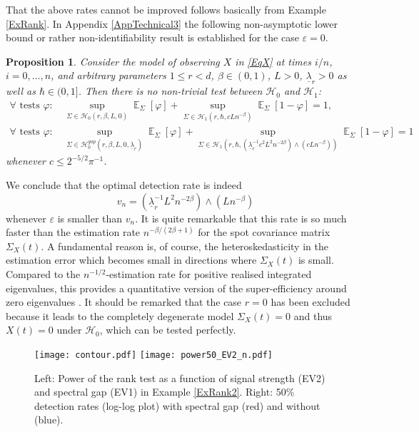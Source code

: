 \documentclass[preprint,aos]{imsart}
\numberwithin{equation}{section}
\newtheorem{proposition}[satz]{Proposition}
\theoremstyle{remark}
\DeclareMathOperator{\E}{{\mathbb E}}
\providecommand{\eps}{\varepsilon}
\renewcommand{\phi}{\varphi}
\renewcommand{\le}{\leqslant}
\begin{document}
That the above rates cannot be improved follows basically from Example \ref{ExRank}. In Appendix \ref{AppTechnical3}  the following non-asymptotic lower bound or rather non-identifiability result is established  for the case $\eps=0$.

\begin{proposition}\label{PropLB}
Consider the model of observing $X$ in \eqref{EqX} at times $i/n$, $i=0,\ldots,n$, and arbitrary parameters $1\le r<d$, $\beta\in(0,1)$, $L>0$, $\underline\lambda_r> 0$ as well as $\hbar\in(0,1]$.
Then there is no non-trivial test between ${\mathcal H}_0$ and ${\mathcal H}_1$:
\begin{align*} \forall\text{ tests }\phi:&\, \sup_{\Sigma\in {\mathcal H}_0(r,\beta,L,0)}\E_\Sigma[\phi]+ \sup_{\Sigma\in {\mathcal H}_1(r,\hbar,cLn^{-\beta})}\E_\Sigma[1-\phi]=1,\\
\forall\text{ tests }\phi:&\, \sup_{\Sigma\in {\mathcal H}_0^{gap}(r,\beta,L,0,\underline\lambda_{r})}\E_\Sigma[\phi]+ \sup_{\Sigma\in {\mathcal H}_1(r,\hbar,(\underline\lambda_r^{-1}c^2L^2n^{-2\beta})\wedge(cLn^{-\beta}))}\E_\Sigma[1-\phi]=1
\end{align*}
whenever $c\le2^{-5/2}\pi^{-1}$.
\end{proposition}

We conclude that the optimal detection rate is indeed
\[ v_n=(\underline\lambda_r^{-1}L^2n^{-2\beta})\wedge(Ln^{-\beta})\]
whenever $\eps$ is smaller than $v_n$. It is quite remarkable that this rate is so much faster than the estimation rate $n^{-\beta/(2\beta+1)}$ for the spot covariance matrix $\Sigma_X(t)$. A fundamental reason is, of course, the heteroskedasticity in the estimation error which becomes small in directions where $\Sigma_X(t)$ is small. Compared to the $n^{-1/2}$-estimation rate for positive realised integrated eigenvalues, this provides a quantitative version of  the super-efficiency around zero eigenvalues \citep[Remark 3]{ait2019}. It should be remarked that the case $r=0$ has been excluded because it leads to the completely degenerate model $\Sigma_X(t)=0$ and thus $X(t)=0$ under ${\mathcal H}_0$, which can be tested perfectly.

\begin{figure}[t]
\centering
\texttt{[image: contour.pdf]} \texttt{[image: power50\_EV2\_n.pdf]}

 \caption{Left: Power of the rank test as a function of signal strength (EV2) and spectral gap (EV1) in Example \ref{ExRank2}. Right: 50\% detection rates (log-log plot) with spectral gap (red) and without (blue).}\label{FigPower}
\end{figure}
\end{document}
